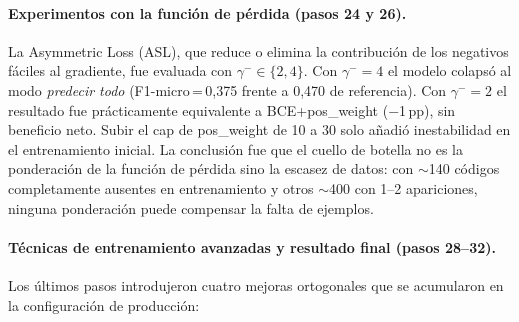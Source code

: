 \paragraph{Experimentos con la función de pérdida (pasos 24 y 26).}
La Asymmetric Loss (ASL), que reduce o elimina la contribución de los negativos fáciles al gradiente, fue evaluada con $\gamma^- \in \{2, 4\}$. Con $\gamma^-=4$ el modelo colapsó al modo \emph{predecir todo} (F1-micro\,=\,0,375 frente a 0,470 de referencia). Con $\gamma^-=2$ el resultado fue prácticamente equivalente a BCE+pos\_weight ($-$1\,pp), sin beneficio neto. Subir el cap de pos\_weight de 10 a 30 solo añadió inestabilidad en el entrenamiento inicial. La conclusión fue que el cuello de botella no es la ponderación de la función de pérdida sino la escasez de datos: con $\sim$140 códigos completamente ausentes en entrenamiento y otros $\sim$400 con 1--2 apariciones, ninguna ponderación puede compensar la falta de ejemplos.

\paragraph{Técnicas de entrenamiento avanzadas y resultado final (pasos 28--32).}
Los últimos pasos introdujeron cuatro mejoras ortogonales que se acumularon en la configuración de producción:

